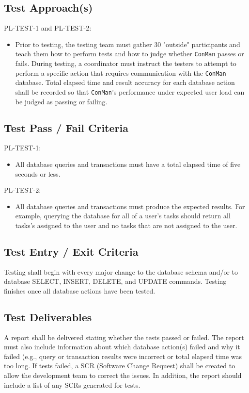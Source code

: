 \documentclass{article}
\begin{document}
\subsection{Test Approach(s)}
PL-TEST-1 and PL-TEST-2:
\begin{itemize}
\item Prior to testing, the testing team must gather 30 "outside" participants 
and teach them how to perform tests and how to judge whether \texttt{ConMan} passes 
or fails. During testing, a coordinator must instruct the testers to attempt to 
perform a specific action that requires communication with the \texttt{ConMan} database. 
Total elapsed time and result accuracy for each database action shall be recorded so 
that \texttt{ConMan}'s performance under expected user load can be judged as passing 
or failing.
\end{itemize}

\subsection{Test Pass / Fail Criteria}
PL-TEST-1:
\begin{itemize}
\item All database queries and transactions must have a total elapsed time of five 
seconds or less.
\end{itemize}
PL-TEST-2:
\begin{itemize}
\item All database queries and transactions must produce the expected results. For example, 
querying the database for all of a user's tasks should return all tasks's assigned to 
the user and no tasks that are not assigned to the user.
\end{itemize}

\subsection{Test Entry / Exit Criteria}
Testing shall begin with every major change to the database schema and/or to database SELECT, 
INSERT, DELETE, and UPDATE commands. Testing finishes once all database actions have been 
tested. 

\subsection{Test Deliverables}
A report shall be delivered stating whether the tests passed or failed. The report 
must also include information about which database action(s) failed and why it failed (e.g., 
query or transaction results were incorrect or total elapsed time was too long. If tests 
failed, a SCR (Software Change Request) shall be created to allow the development 
team to correct the issues. In addition, the report should include a list of any 
SCRs generated for tests.
\end{document}
